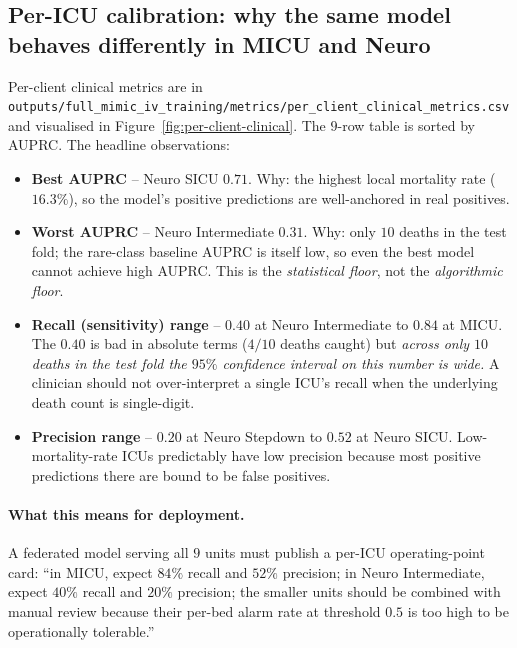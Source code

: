 \subsection{Per-ICU calibration: why the same model behaves differently in MICU and Neuro}
Per-client clinical metrics are in
\texttt{outputs/full\_mimic\_iv\_training/metrics/per\_client\_clinical\_metrics.csv}
and visualised in Figure~\ref{fig:per-client-clinical}. The $9$-row table is
sorted by AUPRC. The headline observations:
\begin{itemize}[leftmargin=*,nosep]
    \item \textbf{Best AUPRC} -- Neuro SICU $0.71$. Why: the highest local
        mortality rate ($16.3\%$), so the model's positive predictions are
        well-anchored in real positives.
    \item \textbf{Worst AUPRC} -- Neuro Intermediate $0.31$. Why: only $10$
        deaths in the test fold; the rare-class baseline AUPRC is itself low,
        so even the best model cannot achieve high AUPRC. This is the
        \emph{statistical floor}, not the \emph{algorithmic floor}.
    \item \textbf{Recall (sensitivity) range} -- $0.40$ at Neuro Intermediate
        to $0.84$ at MICU. The $0.40$ is bad in absolute terms ($4/10$ deaths
        caught) but \emph{across only $10$ deaths in the test fold the
        $95\%$ confidence interval on this number is wide.} A clinician should
        not over-interpret a single ICU's recall when the underlying death
        count is single-digit.
    \item \textbf{Precision range} -- $0.20$ at Neuro Stepdown to $0.52$ at
        Neuro SICU. Low-mortality-rate ICUs predictably have low precision
        because most positive predictions there are bound to be false
        positives.
\end{itemize}
\paragraph{What this means for deployment.} A federated model serving all $9$
units must publish a per-ICU operating-point card: ``in MICU, expect $84\%$
recall and $52\%$ precision; in Neuro Intermediate, expect $40\%$ recall and
$20\%$ precision; the smaller units should be combined with manual review
because their per-bed alarm rate at threshold $0.5$ is too high to be
operationally tolerable.''

